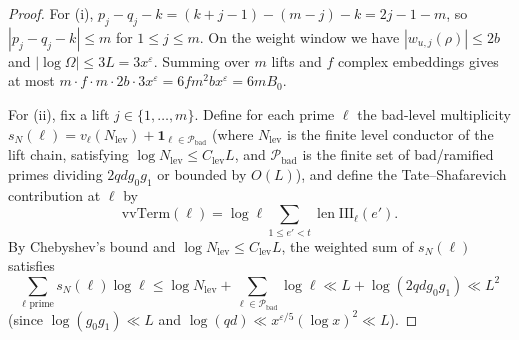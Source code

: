 \documentclass[11pt]{amsart}
\newcommand{\eps}{\varepsilon}
\newcommand{\Sha}{\mathrm{III}}
\DeclareMathOperator{\len}{len}
\theoremstyle{plain}
\theoremstyle{definition}
\numberwithin{equation}{section}
\begin{document}
\begin{proof}
For (i), $p_j-q_j-k=(k+j-1)-(m-j)-k=2j-1-m$, so $|p_j-q_j-k|\le m$ for $1\le j\le m$. On the
weight window we have $|w_{u,j}(\rho)|\le 2b$ and $|\log\Omega|\le 3L=3x^\eps$. Summing over $m$
lifts and $f$ complex embeddings gives at most
$m\cdot f\cdot m\cdot 2b\cdot 3x^\eps=6f m^2 b x^\eps=6mB_0$.

For (ii), fix a lift $j\in\{1,\dots,m\}$. Define for each prime $\ell$ the bad-level multiplicity
$s_N(\ell)=v_\ell(N_{\mathrm{lev}})+\mathbf{1}_{\ell\in\mathcal P_{\mathrm{bad}}}$ (where
$N_{\mathrm{lev}}$ is the finite level conductor of the lift chain, satisfying
$\log N_{\mathrm{lev}}\le C_{\mathrm{lev}}L$, and $\mathcal P_{\mathrm{bad}}$ is the finite set
of bad/ramified primes dividing $2 q d g_0 g_1$ or bounded by $O(L)$), and define the
Tate--Shafarevich contribution at $\ell$ by
\[
\mathrm{vvTerm}(\ell)=\log\ell\sum_{1\le e'<t}\len\Sha_\ell(e').
\]
By Chebyshev's bound and $\log N_{\mathrm{lev}}\le C_{\mathrm{lev}}L$, the weighted sum of
$s_N(\ell)$ satisfies
\[
\sum_{\ell\text{ prime}}s_N(\ell)\log\ell
\le \log N_{\mathrm{lev}}+\sum_{\ell\in\mathcal P_{\mathrm{bad}}}\log\ell
\ll L+\log(2qd g_0 g_1)\ll L^2
\]
(since $\log(g_0 g_1)\ll L$ and $\log(qd)\ll x^{\eps/5}(\log x)^2\ll L$).


\end{proof}
\end{document}
